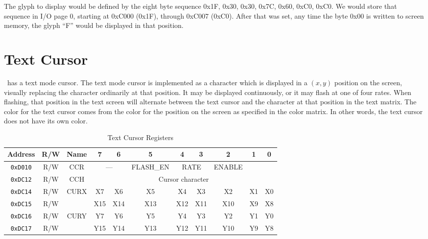 The glyph to display would be defined by the eight byte sequence 0x1F, 0x30, 0x30, 0x7C, 0x60, 0xC0, 0xC0. We would store that sequence in I/O page 0, starting at 0xC000 (0x1F), through 0xC007 (0xC0). After that was set, any time the byte 0x00 is written to screen memory, the glyph ``F'' would be displayed in that position.

\section{Text Cursor}

\jr\ has a text mode cursor. The text mode cursor is implemented as a character which is displayed in a $(x, y)$ position on the screen, visually replacing the character ordinarily at that position. It may be displayed continuously, or it may flash at one of four rates. When flashing, that position in the text screen will alternate between the text cursor and the character at that position in the text matrix. The color for the text cursor comes from the color for the position on the screen as specified in the color matrix. In other words, the text cursor does not have its own color.

\begin{table}[h]
    \begin{center}
        \begin{tabular}{|c|c|c|c|c|c|c|c|c|c|c|} \hline
            Address & R/W & Name & 7 & 6 & 5 & 4 & 3 & 2 & 1 & 0 \\\hline\hline
            \verb+0xD010+ & R/W & CCR & \multicolumn{2}{|c|}{---} & FLASH\_EN & \multicolumn{2}{|c|}{RATE} & ENABLE \\ \hline
            \verb+0xDC12+ & R/W & CCH & \multicolumn{8}{|c|}{Cursor character} \\ \hline
            \verb+0xDC14+ & R/W & \multirow{2}{*}{CURX} & X7 & X6 & X5 & X4 & X3 & X2 & X1 & X0 \\ \hline
            \verb+0xDC15+ & R/W &  & X15 & X14 & X13 & X12 & X11 & X10 & X9 & X8 \\ \hline
            \verb+0xDC16+ & R/W & \multirow{2}{*}{CURY} & Y7 & Y6 & Y5 & Y4 & Y3 & Y2 & Y1 & Y0 \\ \hline
            \verb+0xDC17+ & R/W &  & Y15 & Y14 & Y13 & Y12 & Y11 & Y10 & Y9 & Y8 \\ \hline
        \end{tabular}
    \end{center}
    \caption{Text Cursor Registers}
    \label{tab:txt_crsr_reg}
\end{table}

